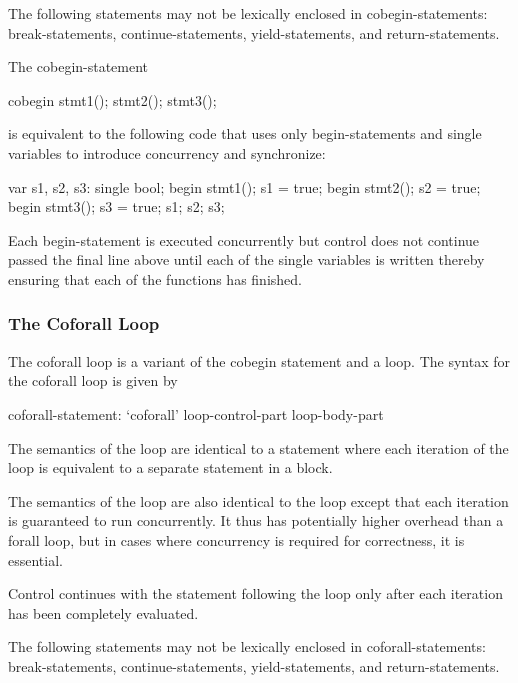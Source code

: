 The following statements may not be lexically enclosed in
cobegin-statements: break-statements, continue-statements,
yield-statements, and return-statements.

\begin{example}
The cobegin-statement
\begin{chapel}
cobegin {
  stmt1();
  stmt2();
  stmt3();
}
\end{chapel}
is equivalent to the following code that uses only begin-statements
and single variables to introduce concurrency and synchronize:
\begin{chapel}
var s1, s2, s3: single bool;
begin { stmt1(); s1 = true; }
begin { stmt2(); s2 = true; }
begin { stmt3(); s3 = true; }
s1; s2; s3;
\end{chapel}
Each begin-statement is executed concurrently but control does not
continue passed the final line above until each of the single
variables is written thereby ensuring that each of the functions has
finished.
\end{example}

\subsubsection{The Coforall Loop}
\label{Coforall}

The coforall loop is a variant of the cobegin statement and a loop.
The syntax for the coforall loop is given by
\begin{syntax}
coforall-statement:
  `coforall' loop-control-part loop-body-part
\end{syntax}

The semantics of the  loop are identical to
a  statement where each iteration of the 
loop is equivalent to a separate statement in a  block.

The semantics of the  loop are also identical to
the  loop except that each iteration is guaranteed to run
concurrently.  It thus has potentially higher overhead than a forall
loop, but in cases where concurrency is required for correctness, it
is essential.

Control continues with the statement following the 
loop only after each iteration has been completely evaluated.

The following statements may not be lexically enclosed in
coforall-statements: break-statements, continue-statements,
yield-statements, and return-statements.

